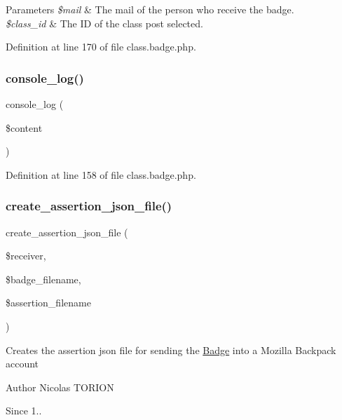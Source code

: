 \begin{DoxyParams}{Parameters}
{\em \$mail} & The mail of the person who receive the badge. \\
\hline
{\em \$class\+\_\+id} & The ID of the class post selected. \\
\hline
\end{DoxyParams}


Definition at line 170 of file class.\+badge.\+php.

\mbox{\label{class_badge_acd17df0ee44fc371bb3ef0be07525ddb}} 
\subsubsection{\texorpdfstring{console\+\_\+log()}{console\_log()}}
{\footnotesize\ttfamily console\+\_\+log (\begin{DoxyParamCaption}\item[{}]{\$content }\end{DoxyParamCaption})}



Definition at line 158 of file class.\+badge.\+php.

\mbox{\label{class_badge_a95417bf38dbd4d414a24a7e4d795ee27}} 
\subsubsection{\texorpdfstring{create\+\_\+assertion\+\_\+json\+\_\+file()}{create\_assertion\_json\_file()}}
{\footnotesize\ttfamily create\+\_\+assertion\+\_\+json\+\_\+file (\begin{DoxyParamCaption}\item[{}]{\$receiver,  }\item[{}]{\$badge\+\_\+filename,  }\item[{}]{\$assertion\+\_\+filename }\end{DoxyParamCaption})}

Creates the assertion json file for sending the \hyperlink{class_badge}{Badge} into a Mozilla Backpack account

\begin{DoxyAuthor}{Author}
Nicolas T\+O\+R\+I\+ON 
\end{DoxyAuthor}
\begin{DoxySince}{Since}
1.. 
\end{DoxySince}

